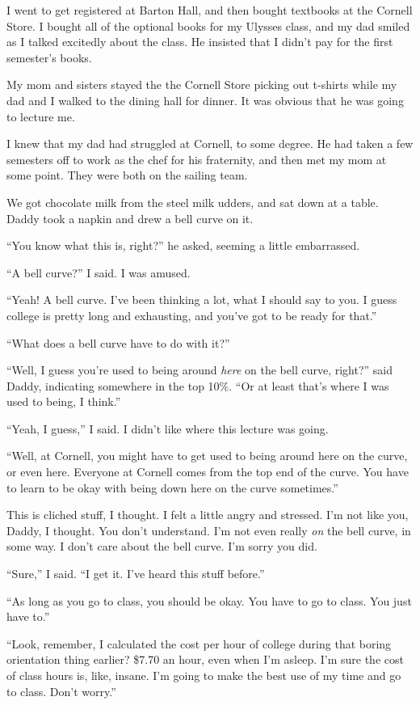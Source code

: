 I went to get registered at Barton Hall, and then bought textbooks at the
Cornell Store.  I bought all of the optional books for my Ulysses class, and my
dad smiled as I talked excitedly about the class.  He insisted that I didn't pay
for the first semester's books.

My mom and sisters stayed the the Cornell Store picking out t-shirts while my
dad and I walked to the dining hall for dinner.  It was obvious that he was
going to lecture me.  

I knew that my dad had struggled at Cornell, to some degree.  He had taken a few
semesters off to work as the chef for his fraternity, and then met my mom at
some point.  They were both on the sailing team.

We got chocolate milk from the steel milk udders, and sat down at a table.
Daddy took a napkin and drew a bell curve on it.

``You know what this is, right?'' he asked, seeming a little embarrassed.

``A bell curve?'' I said.  I was amused.

``Yeah!  A bell curve.  I've been thinking a lot, what I should say to you.  I
guess college is pretty long and exhausting, and you've got to be ready for that.''  

``What does a bell curve have to do with it?''

``Well, I guess you're used to being around \textit{here} on the bell curve,
right?'' said Daddy, indicating somewhere in the top 10\%.  ``Or at least that's
where I was used to being, I think.''  

``Yeah, I guess,'' I said.  I didn't like where this lecture was going.

``Well, at Cornell, you might have to get used to being around here on the
curve, or even here.  Everyone at Cornell comes from the top end of the curve.
You have to learn to be okay with being down here on the curve sometimes.''

This is cliched stuff, I thought.  I felt a little angry and stressed.  I'm not
like you, Daddy, I thought.  You don't understand.  I'm not even really
\textit{on} the bell curve, in some way.  I don't care about the bell curve.
I'm sorry you did.

``Sure,'' I said.  ``I get it.  I've heard this stuff before.''

``As long as you go to class, you should be okay.  You have to go to class.  You
just have to.''

``Look, remember, I calculated the cost per hour of college during that boring
orientation thing earlier?  \$7.70 an hour, even when I'm asleep.  I'm sure the
cost of class hours is, like, insane.  I'm going to make the best use of my time
and go to class. Don't worry.''

